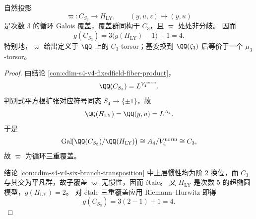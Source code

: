 \begin{conclusion}\label{con:cdim-s4-v4-etale-c3-torsor}
自然投影
\[
\varpi:C_{S_3}\longrightarrow H_{\mathrm{LY}},\qquad (y,u,z)\longmapsto(y,u)
\]
是次数 \(3\) 的循环 Galois 覆盖，覆盖群同构于 \(C_3\)，且 \(\varpi\) 处处非分歧。
因而
\[
g(C_{S_3})=3\bigl(g(H_{\mathrm{LY}})-1\bigr)+1=4.
\]
特别地，\(\varpi\) 给出定义于 \(\QQ\) 上的 \(C_3\)-torsor；基变换到 \(\QQ(\zeta_3)\) 后等价于一个 \(\mu_3\)-torsor。
\end{conclusion}
\begin{proof}
由结论 \ref{con:cdim-s4-v4-fixedfield-fiber-product}，
\[
\QQ(C_{S_3})=L^{V_{4}^{\mathrm{norm}}}.
\]
判别式平方根扩张对应符号同态 \(S_4\to\{\pm1\}\)，故
\[
\QQ(H_{\mathrm{LY}})=\QQ(y,u)=L^{A_4}.
\]
于是
\[
\mathrm{Gal}\!\bigl(\QQ(C_{S_3})/\QQ(H_{\mathrm{LY}})\bigr)\cong A_4/V_4^{\mathrm{norm}}\cong C_3,
\]
故 \(\varpi\) 为循环三重覆盖。

结论 \ref{con:cdim-s4-v4-six-branch-transposition} 中上层惯性均为阶 \(2\) 换位，而 \(C_3\) 与其交为平凡群，故子覆盖 \(\varpi\) 无惯性，因而 étale。
又 \(H_{\mathrm{LY}}\) 是次数 \(5\) 的超椭圆模型，\(g(H_{\mathrm{LY}})=2\)。
对 étale 三重覆盖应用 Riemann--Hurwitz 即得
\[
g(C_{S_3})=3(2-1)+1=4.
\]
\end{proof}

